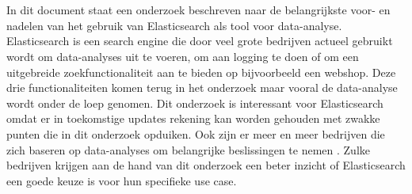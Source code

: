 




\chapter*{}

In dit document staat een onderzoek beschreven naar de belangrijkste voor- en nadelen van het gebruik van
Elasticsearch als tool voor data-analyse. Elasticsearch is een search engine die door veel grote bedrijven actueel gebruikt wordt om data-analyses uit te voeren, om aan logging te doen of om een uitgebreide zoekfunctionaliteit aan te bieden op bijvoorbeeld een webshop. Deze drie functionaliteiten komen terug in het onderzoek maar vooral de data-analyse wordt onder de loep genomen. Dit onderzoek is interessant voor Elasticsearch omdat er in toekomstige updates rekening kan worden gehouden met zwakke punten die in dit onderzoek opduiken. Ook zijn er meer en meer bedrijven die zich baseren op data-analyses om belangrijke beslissingen te nemen \autocite{Whissel2009}. Zulke bedrijven krijgen aan de hand van dit onderzoek een beter inzicht of Elasticsearch een goede keuze is voor hun specifieke use case.

